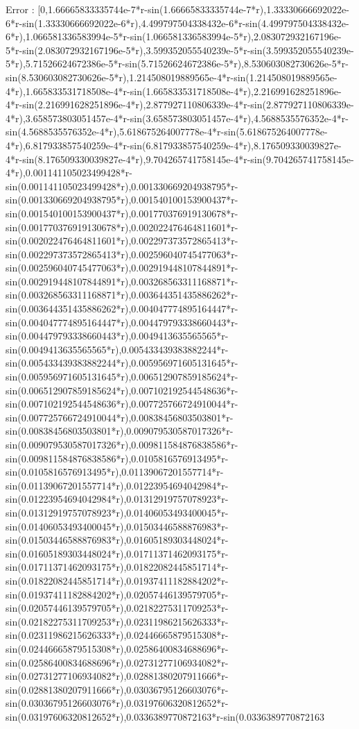 \documentclass[a4paper,10pt]{article}
\begin{document}
\begin{eulernotebook}
\begin{eulercomment}
\begin{eulercomment}
\begin{eulercomment}
\begin{eulercomment}
\begin{eulercomment}
\begin{eulercomment}
\begin{eulercomment}
\begin{eulercomment}
\begin{eulercomment}
\begin{eulercomment}
\begin{eulercomment}
\begin{eulercomment}
\begin{eulercomment}
\begin{eulercomment}
\begin{eulercomment}
\begin{eulercomment}
\begin{euleroutput}
  Error : [0,1.66665833335744e-7*r-sin(1.66665833335744e-7*r),1.33330666692022e-6*r-sin(1.33330666692022e-6*r),4.499797504338432e-6*r-sin(4.499797504338432e-6*r),1.066581336583994e-5*r-sin(1.066581336583994e-5*r),2.083072932167196e-5*r-sin(2.083072932167196e-5*r),3.599352055540239e-5*r-sin(3.599352055540239e-5*r),5.71526624672386e-5*r-sin(5.71526624672386e-5*r),8.530603082730626e-5*r-sin(8.530603082730626e-5*r),1.214508019889565e-4*r-sin(1.214508019889565e-4*r),1.665833531718508e-4*r-sin(1.665833531718508e-4*r),2.216991628251896e-4*r-sin(2.216991628251896e-4*r),2.877927110806339e-4*r-sin(2.877927110806339e-4*r),3.658573803051457e-4*r-sin(3.658573803051457e-4*r),4.5688535576352e-4*r-sin(4.5688535576352e-4*r),5.618675264007778e-4*r-sin(5.618675264007778e-4*r),6.817933857540259e-4*r-sin(6.817933857540259e-4*r),8.176509330039827e-4*r-sin(8.176509330039827e-4*r),9.704265741758145e-4*r-sin(9.704265741758145e-4*r),0.001141105023499428*r-sin(0.001141105023499428*r),0.001330669204938795*r-sin(0.001330669204938795*r),0.001540100153900437*r-sin(0.001540100153900437*r),0.001770376919130678*r-sin(0.001770376919130678*r),0.002022476464811601*r-sin(0.002022476464811601*r),0.002297373572865413*r-sin(0.002297373572865413*r),0.002596040745477063*r-sin(0.002596040745477063*r),0.002919448107844891*r-sin(0.002919448107844891*r),0.003268563311168871*r-sin(0.003268563311168871*r),0.003644351435886262*r-sin(0.003644351435886262*r),0.004047774895164447*r-sin(0.004047774895164447*r),0.004479793338660443*r-sin(0.004479793338660443*r),0.0049413635565565*r-sin(0.0049413635565565*r),0.005433439383882244*r-sin(0.005433439383882244*r),0.005956971605131645*r-sin(0.005956971605131645*r),0.006512907859185624*r-sin(0.006512907859185624*r),0.007102192544548636*r-sin(0.007102192544548636*r),0.007725766724910044*r-sin(0.007725766724910044*r),0.00838456803503801*r-sin(0.00838456803503801*r),0.009079530587017326*r-sin(0.009079530587017326*r),0.009811584876838586*r-sin(0.009811584876838586*r),0.0105816576913495*r-sin(0.0105816576913495*r),0.01139067201557714*r-sin(0.01139067201557714*r),0.01223954694042984*r-sin(0.01223954694042984*r),0.01312919757078923*r-sin(0.01312919757078923*r),0.01406053493400045*r-sin(0.01406053493400045*r),0.01503446588876983*r-sin(0.01503446588876983*r),0.01605189303448024*r-sin(0.01605189303448024*r),0.01711371462093175*r-sin(0.01711371462093175*r),0.01822082445851714*r-sin(0.01822082445851714*r),0.01937411182884202*r-sin(0.01937411182884202*r),0.02057446139579705*r-sin(0.02057446139579705*r),0.02182275311709253*r-sin(0.02182275311709253*r),0.02311986215626333*r-sin(0.02311986215626333*r),0.02446665879515308*r-sin(0.02446665879515308*r),0.02586400834688696*r-sin(0.02586400834688696*r),0.02731277106934082*r-sin(0.02731277106934082*r),0.02881380207911666*r-sin(0.02881380207911666*r),0.03036795126603076*r-sin(0.03036795126603076*r),0.03197606320812652*r-sin(0.03197606320812652*r),0.0336389770872163*r-sin(0.0336389770872163
\end{euleroutput}
\end{eulercomment}
\end{eulercomment}
\end{eulercomment}
\end{eulercomment}
\end{eulercomment}
\end{eulercomment}
\end{eulercomment}
\end{eulercomment}
\end{eulercomment}
\end{eulercomment}
\end{eulercomment}
\end{eulercomment}
\end{eulercomment}
\end{eulercomment}
\end{eulercomment}
\end{eulercomment}
\end{eulernotebook}
\end{document}
